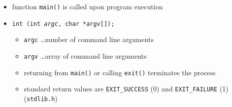 

\begin{slide}
\renewcommand{\baselinestretch}{0.4}
\begin{itemize}
\setlength{\itemsep}{-0.5ex}
\setlength{\topsep}{1\itemsep}
\item function \texttt{main()} is called upon program execution
\item \texttt{int  (int \emph{argc}, char *\emph{argv}[]);}
    \begin{itemize}
    \item \texttt{argc} \dots number of command line arguments
    \item \texttt{argv} \dots array of command line arguments
    \item returning from \texttt{main()} or calling \texttt{exit()} terminates the
    process
    \item standard return values are \verb#EXIT_SUCCESS# (0) and
    \verb#EXIT_FAILURE# (1) (\texttt{stdlib.h})
    \end{itemize}
\end{itemize}

\begin{center}

\end{center}
\end{slide}

